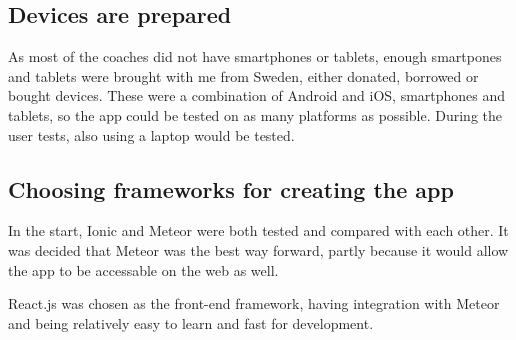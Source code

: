 \subsection{Devices are prepared}
As most of the coaches did not have smartphones or tablets, enough smartpones and tablets were brought with me from Sweden, either donated, borrowed or bought devices. These were a combination of Android and iOS, smartphones and tablets, so the app could be tested on as many platforms as possible. During the user tests, also using a laptop would be tested.


\subsection{Choosing frameworks for creating the app}

In the start, Ionic and Meteor were both tested and compared with each other. It was decided that Meteor was the best way forward, partly because it would allow the app to be accessable on the web as well. %

React.js was chosen as the front-end framework, having integration with Meteor and being relatively easy to learn and fast for development.
